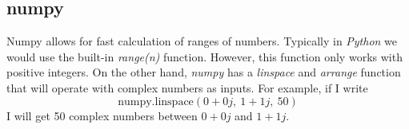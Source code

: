 \documentclass{article}
\begin{document}
        \subsection{numpy}
        Numpy allows for fast calculation of ranges of numbers. Typically in \textit{Python} we would use the built-in \textit{range(n)} function. However, this function only works with positive integers. On the other hand, \textit{numpy} has a \textit{linspace} and \textit{arrange} function that will operate with complex numbers as inputs. For example, if I write
        $$\text{numpy.linspace}(0+0j,\ 1+1j,\ 50)$$
        I will get 50 complex numbers between $0+0j$ and $1+1j$.
    
\end{document}
